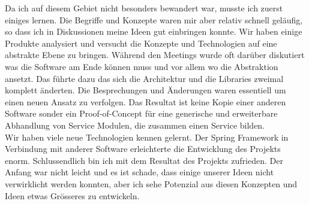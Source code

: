 Da ich auf diesem Gebiet nicht besonders bewandert war, musste ich zuerst einiges lernen. Die Begriffe und Konzepte waren mir aber relativ schnell geläufig, so dass ich in Diskussionen meine Ideen gut einbringen konnte. Wir haben einige Produkte analysiert und versucht die Konzepte und Technologien auf eine abstrakte Ebene zu bringen. Während den Meetings wurde oft darüber diskutiert was die Software am Ende können muss und vor allem wo die Abstraktion ansetzt. Das führte dazu das sich die Architektur und die Libraries zweimal komplett änderten. Die Besprechungen und Änderungen waren essentiell um einen neuen Ansatz zu verfolgen. Das Resultat ist keine Kopie einer anderen Software sonder ein Proof-of-Concept für eine generische und erweiterbare Abhandlung von Service Modulen, die zusammen einen Service bilden.\\

Wir haben viele neue Technologien kennen gelernt. Der Spring Framework in Verbindung mit anderer Software erleichterte die Entwicklung des Projekts enorm. Schlussendlich bin ich mit dem Resultat des Projekts zufrieden. Der Anfang war nicht leicht und es ist schade, dass einige unserer Ideen nicht verwirklicht werden konnten, aber ich sehe Potenzial aus diesen Konzepten und Ideen etwas Grösseres zu entwickeln.